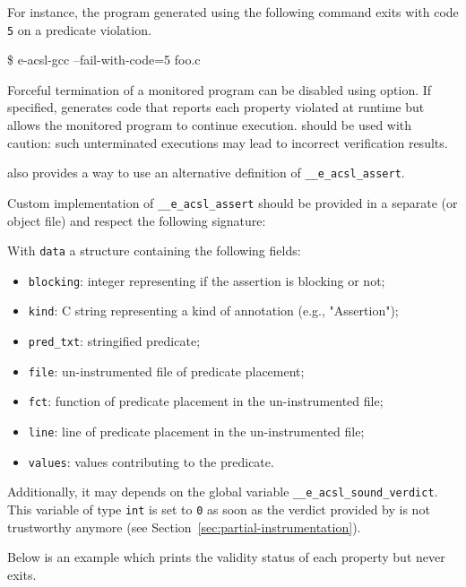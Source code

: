 For instance, the program generated using the following command
exits with code \texttt{5} on a predicate violation.
\begin{logs}
\$ e-acsl-gcc --fail-with-code=5 foo.c
\end{logs}

Forceful termination of a monitored program can be disabled using
 option. If specified, \eacslgcc generates code that
reports each property violated at runtime but allows the monitored program to
continue execution.  should be used with caution:
such unterminated executions may lead to incorrect verification results.

\eacslgcc also provides a way to use an alternative definition of
\texttt{\_\_e\_acsl\_assert}.

Custom implementation of \texttt{\_\_e\_acsl\_assert}
should be provided in a separate \C (or object file) and respect the
following signature:


With \texttt{data} a structure containing the following fields:
\begin{itemize}
  \item \texttt{blocking}: integer representing if the assertion is blocking or
        not;
  \item \texttt{kind}: C string representing a kind of annotation (e.g.,
        "Assertion");
  \item \texttt{pred\_txt}: stringified predicate;
  \item \texttt{file}: un-instrumented file of predicate placement;
  \item \texttt{fct}: function of predicate placement in the un-instrumented
        file;
  \item \texttt{line}: line of predicate placement in the un-instrumented file;
  \item \texttt{values}: values contributing to the predicate.
\end{itemize}

Additionally, it may depends on the global variable
\texttt{\_\_e\_acsl\_sound\_verdict}. This
variable of type \texttt{int} is set to \texttt{0} as soon as the verdict
provided by \eacsl is not trustworthy anymore (see
Section~\ref{sec:partial-instrumentation}).

Below is an example which prints the validity status of each property but never
exits.

